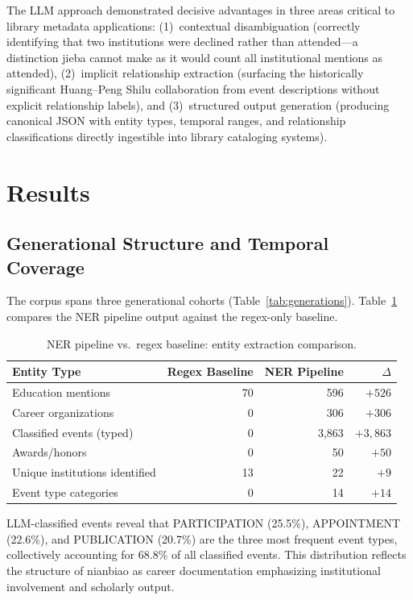 \documentclass[review]{elsarticle}
\begin{document}
The LLM approach demonstrated decisive advantages in three areas critical to library metadata applications: (1)~contextual disambiguation (correctly identifying that two institutions were declined rather than attended---a distinction jieba cannot make as it would count all institutional mentions as attended), (2)~implicit relationship extraction (surfacing the historically significant Huang--Peng Shilu collaboration from event descriptions without explicit relationship labels), and (3)~structured output generation (producing canonical JSON with entity types, temporal ranges, and relationship classifications directly ingestible into library cataloging systems).

\section{Results}

\subsection{Generational Structure and Temporal Coverage}

The corpus spans three generational cohorts (Table~\ref{tab:generations}). Table~\ref{tab:ner_comparison} compares the NER pipeline output against the regex-only baseline.

\begin{table}[ht]
\centering
\caption{NER pipeline vs.\ regex baseline: entity extraction comparison.}
\label{tab:ner_comparison}
\begin{tabular}{lrrr}
\toprule
Entity Type & Regex Baseline & NER Pipeline & $\Delta$ \\
\midrule
Education mentions & 70 & 596 & $+526$ \\
Career organizations & 0 & 306 & $+306$ \\
Classified events (typed) & 0 & 3,863 & $+3,863$ \\
Awards/honors & 0 & 50 & $+50$ \\
Unique institutions identified & 13 & 22 & $+9$ \\
Event type categories & 0 & 14 & $+14$ \\
\bottomrule
\end{tabular}
\end{table}

LLM-classified events reveal that PARTICIPATION (25.5\%), APPOINTMENT (22.6\%), and PUBLICATION (20.7\%) are the three most frequent event types, collectively accounting for 68.8\% of all classified events. This distribution reflects the structure of nianbiao as career documentation emphasizing institutional involvement and scholarly output.
\end{document}

